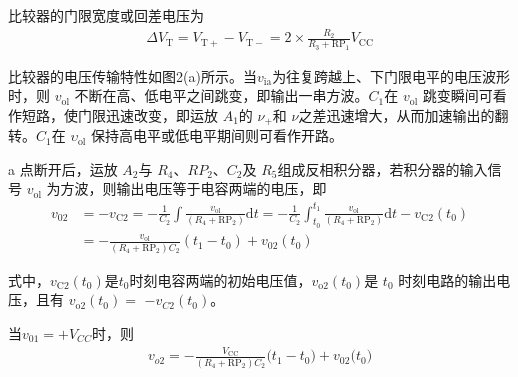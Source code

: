 \documentclass[a4paper,11pt,UTF8]{article}
\numberwithin{equation}{subsection}
\begin{document}
比较器的门限宽度或回差电压为
\begin{align}
	\Delta V_{\mathrm{T}}=V_{\mathrm{T+}}-V_{\mathrm{T-}}=2\times\frac{R_{2}}{R_{3}+\mathrm{RP}_{1}}V_{\mathrm{CC}}
\end{align}

比较器的电压传输特性如图2(a)所示。当$v_\mathrm{ia}$为往复跨越上、下门限电平的电压波形时，则 $v_\mathrm{ol}$ 不断在高、低电平之间跳变，即输出一串方波。$C_1$在 $v_\mathrm{ol}$ 跳变瞬间可看作短路，使门限迅速改变，即运放 $A_1$的 $\nu_+$和 $\nu$之差迅速增大，从而加速输出的翻转。$C_1$在 $\upsilon_\mathrm{ol}$ 保持高电平或低电平期间则可看作开路。
\begin{figure}[H]
	\centering
	\caption{}
\end{figure}
a 点断开后，运放 $A_2$与 $R_4$、$RP_2$、$C_2$及 $R_5$组成反相积分器，若积分器的输入信号 $v_\mathrm{ol}$ 为方波，则输出电压等于电容两端的电压，即
\begin{align}
	v_{02}& =-v_{\mathrm{C2}}=-\frac{1}{C_{2}}\int\frac{v_{\mathrm{ol}}}{(R_{4}+\mathrm{RP}_{2})}\mathrm{d}t=-\frac{1}{C_{2}}\int_{t_{0}}^{t_{1}}\frac{v_{\mathrm{ol}}}{(R_{4}+\mathrm{RP}_{2})}\mathrm{d}t-v_{\mathrm{C2}}(t_{0})\nonumber\\ &=-\frac{v_{\mathrm{ol}}}{(R_{4}+\mathrm{RP}_{2})C_{2}}(t_{1}-t_{0})+v_{02}(t_{0})
\end{align}

式中，$v_{\mathrm{C2}}(t_0)$是$t_0$时刻电容两端的初始电压值，$v_{\mathrm{o2}}(t_0)$是 $t_0$ 时刻电路的输出电压，且有 $v_{\mathrm{o2}}(t_0)=$ $-v_{C2}(t_0)$。

当$v_{01}=+V_{CC}$时，则
\begin{align}
	v_{o2}=-\frac{V_{\mathrm{CC}}}{(R_{4}+\mathrm{RP}_{2})C_{2}}\big(t_{1}-t_{0}\big)+v_{02}\big(t_{0}\big)
\end{align}
\end{document}
